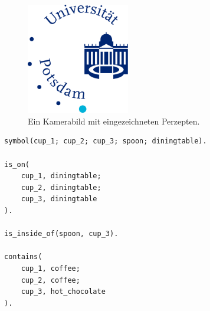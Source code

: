 \begin{figure}
    \centering
    \includegraphics[width=0.4\textwidth]{gfx/unilogo.jpg}
    \caption{Ein Kamerabild mit eingezeichneten Perzepten.}
    \label{fig:cups_yolo}
\end{figure}


\begin{lstlisting}[float,caption={Eine symbolische Beschreibung der Objekte in bla.},label=lst:cups_symbolic]
symbol(cup_1; cup_2; cup_3; spoon; diningtable).

is_on(
    cup_1, diningtable;
    cup_2, diningtable;
    cup_3, diningtable
).

is_inside_of(spoon, cup_3).

contains(
    cup_1, coffee;
    cup_2, coffee;
    cup_3, hot_chocolate
).

\end{lstlisting}



%
%




